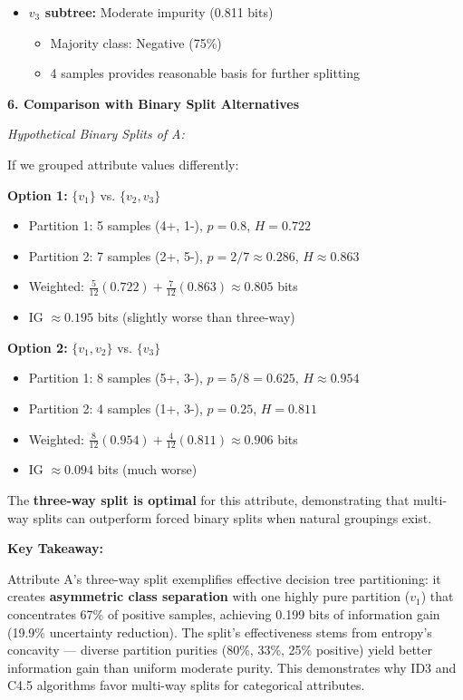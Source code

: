 \documentclass[12pt]{article}
\begin{document}
\begin{explanation}
\begin{itemize}
    \item \textbf{$v_3$ subtree:} Moderate impurity (0.811 bits)
    \begin{itemize}
        \item Majority class: Negative (75\%)
        \item 4 samples provides reasonable basis for further splitting
    \end{itemize}
\end{itemize}

\textbf{6. Comparison with Binary Split Alternatives}

\textit{Hypothetical Binary Splits of A:}

If we grouped attribute values differently:

\textbf{Option 1:} $\{v_1\}$ vs. $\{v_2, v_3\}$
\begin{itemize}
    \item Partition 1: 5 samples (4+, 1-), $p = 0.8$, $H = 0.722$
    \item Partition 2: 7 samples (2+, 5-), $p = 2/7 \approx 0.286$, $H \approx 0.863$
    \item Weighted: $\frac{5}{12}(0.722) + \frac{7}{12}(0.863) \approx 0.805$ bits
    \item IG $\approx 0.195$ bits (slightly worse than three-way)
\end{itemize}

\textbf{Option 2:} $\{v_1, v_2\}$ vs. $\{v_3\}$
\begin{itemize}
    \item Partition 1: 8 samples (5+, 3-), $p = 5/8 = 0.625$, $H \approx 0.954$
    \item Partition 2: 4 samples (1+, 3-), $p = 0.25$, $H = 0.811$
    \item Weighted: $\frac{8}{12}(0.954) + \frac{4}{12}(0.811) \approx 0.906$ bits
    \item IG $\approx 0.094$ bits (much worse)
\end{itemize}

The \textbf{three-way split is optimal} for this attribute, demonstrating that multi-way splits can outperform forced binary splits when natural groupings exist.

\textbf{Key Takeaway:}

Attribute A's three-way split exemplifies effective decision tree partitioning: it creates \textbf{asymmetric class separation} with one highly pure partition ($v_1$) that concentrates 67\% of positive samples, achieving 0.199 bits of information gain (19.9\% uncertainty reduction). The split's effectiveness stems from entropy's concavity — diverse partition purities (80\%, 33\%, 25\% positive) yield better information gain than uniform moderate purity. This demonstrates why ID3 and C4.5 algorithms favor multi-way splits for categorical attributes.
\end{explanation}
\end{document}
